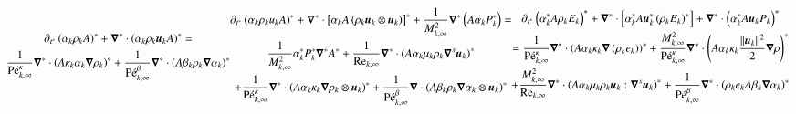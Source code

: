 \documentclass[preprint,10pt]{elsarticle}
\begin{document}
\begin{subequations}\label{eq:sev_equ_case_one_scaled}
%
%
\begin{multline}\label{eq:sev_equ-with-diss-terms-cont_case_one_scaled}
\partial_{t^*} \left( \alpha_k \rho_k A \right)^* + \grad^* \cdot \left( \alpha_k \rho_k \mbold u_k A \right)^* = \\ \frac{1}{\Pe^\kappa_{k,\infty}}\grad^* \cdot \left(A \kappa_k \alpha_k \grad \rho_k \right)^* +
\frac{1}{\Pe_{k,\infty}^\beta} \grad^* \cdot \left( A \beta_k \rho_k \grad \alpha_k \right)^*
\end{multline}
%
\begin{multline}\label{eq:sev_equ-with-diss-terms-mom_case_one_scaled}
\partial_{t^*} \left( \alpha_k \rho_k u_k A \right)^* + \grad^* \cdot \left[ \alpha_k A \left( \rho_k \mbold u_k \otimes \mbold u_k\right)\right]^* + \frac{1}{M^2_{k,\infty}}\grad^* \left( A \alpha_k P_k^* \right) = \\
  \frac{1}{M^2_{k,\infty}} \alpha_k^* P^*_k \grad^* A^*  
+ \frac{1}{\Re_{k,\infty}}\grad^* \cdot \left( A \alpha_k \mu_k \rho_k \grad^s \mbold u_k \right)^* \\ 
+ \frac{1}{\Pe_{k,\infty}^\kappa} \grad^* \cdot\left( A \alpha_k \kappa_k \grad \rho_k \otimes \mbold u_k \right)^* 
+ \frac{1}{\Pe_{k,\infty}^\beta} \grad \cdot \left( A \beta_k \rho_k \grad \alpha_k \otimes \mbold u_k \right)^*
\end{multline}
%
\begin{multline}\label{eq:sev_equ-with-diss-terms-ener_case_one_scaled}
\partial_{t^*} \left( \alpha_k^* A \rho_k E_k \right)^* + \grad^* \cdot \left[ \alpha_k^* A \mbold u_k^*  \left( \rho_k E_k \right)^* \right] +  \grad^* \cdot \left(\alpha_k^* A \mbold u_k P_k \right)^*  \\ =
\frac{1}{\Pe_{k,\infty}^\kappa} \grad^* \cdot \left( A \alpha_k \kappa_k \grad \left( \rho_k e_k \right) \right)^* 
+ \frac{M^2_{k,\infty}}{\Pe_{k,\infty}^\kappa} \grad^* \cdot \left( A\alpha_k \kappa_k \frac{||\mbold u_k||^2}{2} \grad \rho \right)^*  \\
+ \frac{M^2_{k,\infty}}{\Re_{k,\infty}} \grad^* \cdot \left( A \alpha_k \mu_k \rho_k \mbold u_k : \grad^s \mbold u_k\right)^* 
+ \frac{1}{\Pe_{k,\infty}^\beta } \grad^*\cdot \left( \rho_k e_k A \beta_k \grad \alpha_k \right)^*
\end{multline}
%
\end{subequations}
\end{document}
